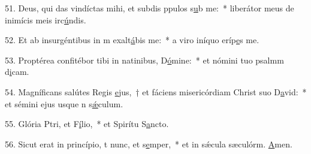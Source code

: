 51. Deus, qui das vindíctas mihi, et subdis ppulos s\uline{u}b me:~* liberátor meus de inimícis meis irc\uline{ú}ndis.\par 
52. Et ab insurgéntibus in m exalt\uline{á}bis me:~* a viro iníquo eríp\uline{e}s me.\par 
53. Proptérea confitébor tibi in natinibus, D\uline{ó}mine:~* et nómini tuo psalmm d\uline{i}cam.\par 
54. Magníficans salútes Regis \uline{e}jus,~† et fáciens misericórdiam Christ suo D\uline{a}vid:~* et sémini ejus usque n s\uline{ǽ}culum.\par 
55. Glória Ptri, et F\uline{í}lio,~* et Spirítu S\uline{a}ncto.\par 
56. Sicut erat in princípio, t nunc, et s\uline{e}mper,~* et in sǽcula sæculórm. \uline{A}men.\par 
